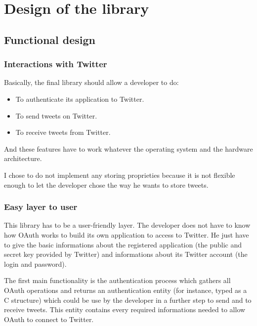 \chapter{Design of the library}


\section{Functional design}

\subsection{Interactions with Twitter}

\hspace{15mm}Basically, the final library should allow a developer to do:
\begin{itemize}
\item To authenticate its application to Twitter. 
\item To send tweets on Twitter.
\item To receive tweets from Twitter.
\end{itemize}

And these features have to work whatever the operating system and the hardware architecture.

I chose to do not implement any storing proprieties because it is not flexible enough to let the developer chose the way he wants to store tweets.


\subsection{Easy layer to user}

\hspace{15mm}This library has to be a user-friendly layer. The developer does not have to know how OAuth works to build its own application to access to Twitter. He just have to give the basic informations about the registered application (the public and secret key provided by Twitter) and informations about its Twitter account (the login and password).

The first main functionality is the authentication process which gathers all OAuth operations and returns an authentication entity (for instance, typed as a C structure) which could be use by the developer in a further step to send and to receive tweets. This entity contains every required informations needed to allow OAuth to connect to Twitter. 

